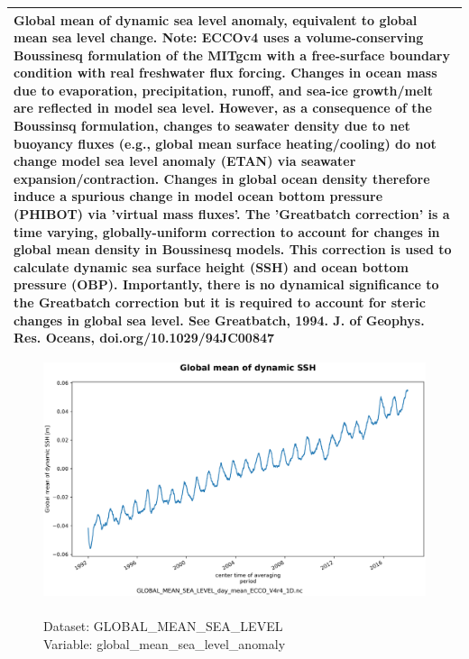 \begin{longtable}{|p{}|p{}|p{}|p{}|}
\multicolumn{4}{|p{1\textwidth}|}{Global mean of dynamic sea level anomaly, equivalent to global mean sea level change. Note: ECCOv4 uses a volume-conserving Boussinesq formulation of the MITgcm with a free-surface boundary condition with real freshwater flux forcing. Changes in ocean mass due to evaporation, precipitation, runoff, and sea-ice growth/melt are reflected in model sea level. However, as a consequence of the Boussinsq formulation, changes to seawater density due to net buoyancy fluxes (e.g., global mean surface heating/cooling) do not change model sea level anomaly (ETAN) via seawater expansion/contraction. Changes in global ocean density therefore induce a spurious change in model ocean bottom pressure (PHIBOT) via 'virtual mass fluxes'. The 'Greatbatch correction' is a time varying, globally-uniform correction to account for changes in global mean density in Boussinesq models. This correction is used to calculate dynamic sea surface height (SSH) and ocean bottom pressure (OBP). Importantly, there is no dynamical significance to the Greatbatch correction but it is required to account for steric changes in global sea level. See Greatbatch, 1994. J. of Geophys. Res. Oceans, doi.org/10.1029/94JC00847} \\ \hline
\end{longtable}

\begin{figure}[H]
\centering
\includegraphics[scale=0.5]{../images/plots/oneD_plots/Global_Mean_Sea_Level/global_mean_sea_level_anomaly.png}
\caption{\\Dataset: GLOBAL\_MEAN\_SEA\_LEVEL\\Variable: global\_mean\_sea\_level\_anomaly}
\label{tab:table-GLOBAL_MEAN_SEA_LEVEL_global_mean_sea_level_anomaly-Plot}
\end{figure}
\pagebreak

